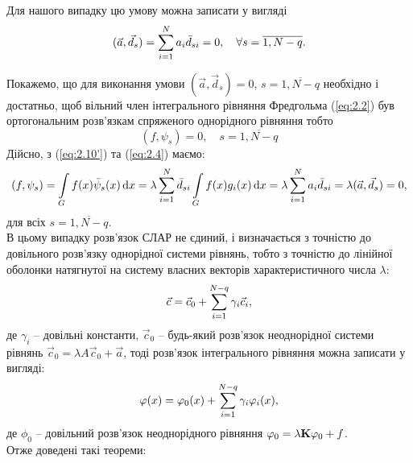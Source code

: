 Для нашого випадку цю умову можна записати у вигляді
\begin{equation}
	\label{eq:2.11}
	(\vec a, \vec d_s) = \Sum_{i = 1}^N a_i \bar d_{si} = 0, \quad \forall s = \overline{1, N - q}.
\end{equation}

Покажемо, що для виконання умови $(\vec a, \vec d_s) = 0$, $s = \overline{1, N - q}$ необхідно і достатньо, щоб вільний член інтегрального рівняння Фредгольма (\ref{eq:2.2}) був ортогональним розв'язкам спряженого однорідного рівняння тобто 
\begin{equation}
	\label{eq:2.12}
	(f, \psi_s) = 0, \quad s = \overline{1, N - q}
\end{equation}
Дійсно, з (\ref{eq:2.10'}) та (\ref{eq:2.4}) маємо:
\[ (f, \psi_s) = \Int_G f(x) \bar \psi_s (x) \diff x = \lambda \Sum_{i = 1}^N \bar d_{si} \Int_G f(x) g_i(x) \diff x = \lambda \Sum_{i = 1}^N a_i \bar d_{si} = \lambda (\vec a, \vec d_s) = 0, \] для всіх $s = \overline{1, N - q}$. \\

В цьому випадку розв'язок СЛАР не єдиний, і визначається з точністю до довільного розв'язку однорідної системи рівнянь, тобто з точністю до лінійної оболонки натягнутої на систему власних векторів характеристичного числа $\lambda$:
\begin{equation}
	\label{eq:2.13}
	\vec c = \vec c_0 + \Sum_{i = 1}^{N - q} \gamma_i \vec c_i,
\end{equation}
де $\gamma_i$ -- довільні константи, $\vec c_0$ -- будь-який розв'язок неоднорідної системи рівнянь $\vec c_0 = \lambda A \vec c_0 + \vec a$, тоді розв'язок інтегрального рівняння можна записати у вигляді:
\begin{equation}
	\label{eq:2.14}
	\phi(x) = \phi_0(x) + \Sum_{i = 1}^{N - q} \gamma_i \phi_i(x),
\end{equation}
де $\phi_0$ -- довільний розв'язок неоднорідного рівняння $\phi_0 = \lambda \bf{K} \phi_0 + f$. \\

Отже доведені такі теореми:

